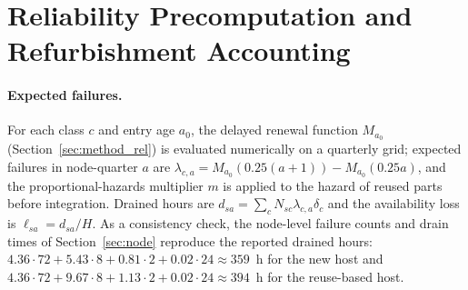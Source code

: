 \documentclass{article} %
\begin{document}
\begin{table}[h]
\caption{SKU and component parameters. Power, throughput and CXL multipliers are placeholders; the GPU AFR is derived from published data; all other values are engineering assumptions.}
\label{tab:params}
\begin{center}
\small
{}
\end{center}
\end{table}

\section{Reliability Precomputation and Refurbishment Accounting}
\label{app:rel}
\paragraph{Expected failures.} For each class $c$ and entry age $a_0$, the delayed renewal function $M_{a_0}$ (Section~\ref{sec:method_rel}) is evaluated numerically on a quarterly grid; expected failures in node-quarter $a$ are $\lambda_{c,a} = M_{a_0}(0.25(a+1)) - M_{a_0}(0.25a)$, and the proportional-hazards multiplier $m$ is applied to the hazard of reused parts before integration. Drained hours are $d_{sa} = \sum_c N_{sc}\lambda_{c,a}\delta_c$ and the availability loss is $\ell_{sa} = d_{sa}/H$. As a consistency check, the node-level failure counts and drain times of Section~\ref{sec:node} reproduce the reported drained hours: $4.36\cdot 72 + 5.43\cdot 8 + 0.81\cdot 2 + 0.02\cdot 24 \approx 359$~h for the new host and $4.36\cdot 72 + 9.67\cdot 8 + 1.13\cdot 2 + 0.02\cdot 24 \approx 394$~h for the reuse-based host.
\end{document}
